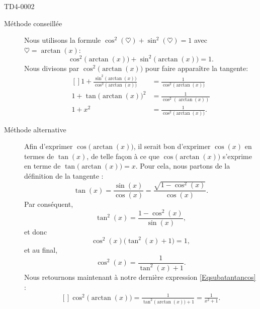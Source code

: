 \begin{corrige}{TD4-0002}
\begin{enumerate}
            \begin{description}
                \item[Méthode conseillée] 
                        Nous utilisons la formule \( \cos^2(\heartsuit)+\sin^2(\heartsuit)=1\) avec \( \heartsuit=\arctan(x)\):
                        \begin{equation}
                            \cos^2\big( \arctan(x) \big)+\sin^2\big( \arctan(x) \big)=1.
                        \end{equation}
                        Nous divisons par \( \cos^2\big( \arctan(x) \big)\) pour faire apparaître la tangente:
                        \begin{equation}
                            \begin{aligned}[]
                                1+\frac{ \sin^2\big( \arctan(x) \big) }{  \cos^2\big( \arctan(x) \big)  }&=\frac{1}{  \cos^2\big( \arctan(x) \big)  }\\
                                1+\tan\big( \arctan(x) \big)^2&=\frac{1}{ \cos^2(\arctan(x)) }\\
                                1+x^2&=\frac{1}{ \cos^2\big( \arctan(x) \big) }.
                            \end{aligned}
                        \end{equation}
                        
                \item[Méthode alternative]

            Afin d'exprimer \( \cos\big( \arctan(x) \big)\),  il serait bon d'exprimer $\cos(x)$ en termes de $\tan(x)$, de telle façon à ce que $\cos\big( \arctan(x) \big)$ s'exprime en terme de $\tan\big( \arctan(x) \big)=x$. Pour cela, nous partons de la définition de la tangente :
			\begin{equation}
				\tan(x)=\frac{ \sin(x) }{ \cos(x) }=\frac{ \sqrt{1-\cos^2(x)} }{ \cos(x) }.
			\end{equation}
			Par conséquent,
			\begin{equation}
				\tan^2(x)=\frac{ 1-\cos^2(x) }{ \sin(x) },
			\end{equation}
			et donc
			\begin{equation}
				\cos^2(x)\big( \tan^2(x)+1 \big)=1,
			\end{equation}
			et au final,
			\begin{equation}
				\cos^2(x)=\frac{1}{ \tan^2(x)+1 }.
			\end{equation}
			Nous retournons maintenant à notre dernière expression \eqref{Eqsubatantancos} :
			\begin{equation}
				\begin{aligned}[]
					\cos^2\big( \arctan(x) \big)=\frac{1}{ \tan^2\big( \arctan(x) \big)+1 }=\frac{1}{ x^2+1 }.
				\end{aligned}
			\end{equation}


\end{description}
\end{enumerate}
\end{corrige}
